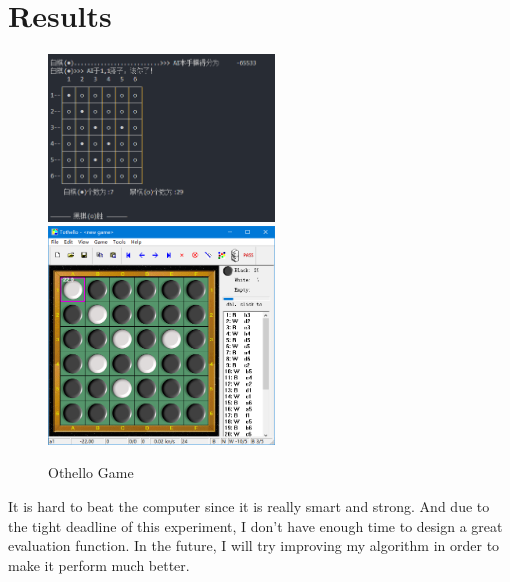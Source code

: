 \documentclass[a4paper, 11pt]{article}
\begin{document}
\section{Results}

\begin{figure}[ht]
  \centering
  \includegraphics[width=6cm]{Pic/1}
  \qquad
  \includegraphics[width=6cm]{Pic/2}
  \caption{Othello Game}
  \label{fig:othello}
\end{figure}

It is hard to beat the computer since it is really smart and strong. And due to the tight deadline of this experiment, I don't have enough time to design a great evaluation function. In the future, I will try improving my algorithm in order to make it perform much better.

%
%
\end{document}
